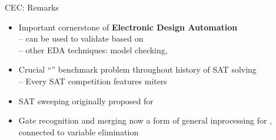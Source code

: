 \documentclass[t,english]{sdqbeamer}
\begin{document}
\begin{frame}{CEC: Remarks}
	\begin{itemize}
		\item Important cornerstone of \textbf{Electronic Design Automation}~\cite{marques2000boolean}\\
		-- can be used to validate  based on \\
		-- other EDA techniques: model checking, 
		\item Crucial ``'' benchmark problem throughout history of SAT solving\\
		-- Every SAT competition features miters
		\item SAT sweeping originally proposed for ~\cite{kuehlmann2004dynamic}
		\item Gate recognition and merging now a form of general inprocessing for ,\\
		connected to variable elimination~\cite{biere2022gimsatul}
	\end{itemize}
\end{frame}
\end{document}
